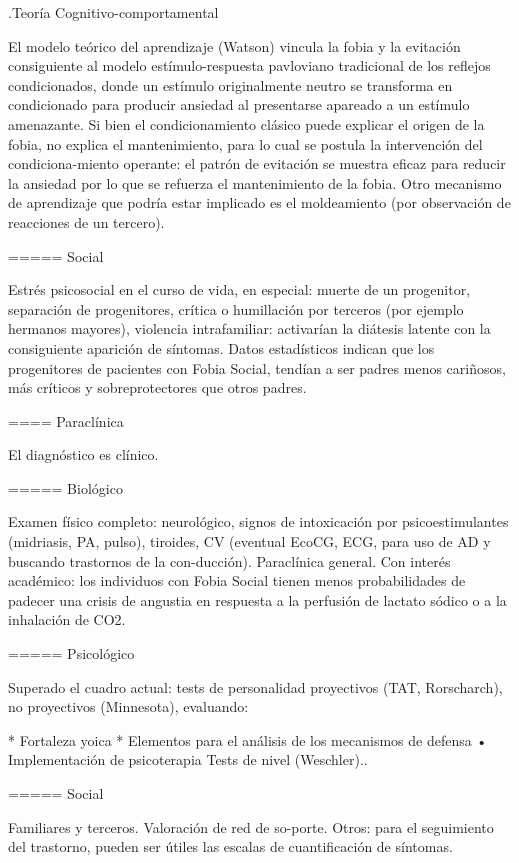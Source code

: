 .Teoría Cognitivo-comportamental

El modelo teórico del aprendizaje (Watson) vincula la fobia y la evitación consiguiente al modelo estímulo-respuesta pavloviano tradicional de los reflejos condicionados, donde un estímulo originalmente neutro se transforma en condicionado para producir ansiedad al presentarse apareado a un estímulo amenazante. Si bien el condicionamiento clásico puede explicar el origen de la fobia, no explica el mantenimiento, para lo cual se postula la intervención del condiciona-miento operante: el patrón de evitación se muestra eficaz para reducir la ansiedad por lo que se refuerza el mantenimiento de la fobia. Otro mecanismo de aprendizaje que podría estar implicado es el moldeamiento (por observación de reacciones de un tercero).

===== Social

Estrés psicosocial en el curso de vida, en especial: muerte de un progenitor, separación de progenitores, crítica o humillación por terceros (por ejemplo hermanos mayores), violencia intrafamiliar: activarían la diátesis latente con la consiguiente aparición de síntomas. Datos estadísticos indican que los progenitores de pacientes con Fobia Social, tendían a ser padres menos cariñosos, más críticos y sobreprotectores que otros padres.

==== Paraclínica

El diagnóstico es clínico.

===== Biológico

Examen físico completo: neurológico, signos de intoxicación por psicoestimulantes (midriasis, PA, pulso), tiroides, CV (eventual EcoCG, ECG, para uso de AD y buscando trastornos de la con-ducción). Paraclínica general. Con interés académico: los individuos con Fobia Social tienen menos probabilidades de padecer una crisis de angustia en respuesta a la perfusión de lactato sódico o a la inhalación de CO2.

===== Psicológico

Superado el cuadro actual: tests de personalidad proyectivos (TAT, Rorscharch), no proyectivos (Minnesota), evaluando:

* Fortaleza yoica
* Elementos para el análisis de los mecanismos de defensa • Implementación de psicoterapia Tests de nivel (Weschler)..

===== Social

Familiares y terceros. Valoración de red de so-porte. Otros: para el seguimiento del trastorno, pueden ser útiles las escalas de cuantificación de síntomas.

